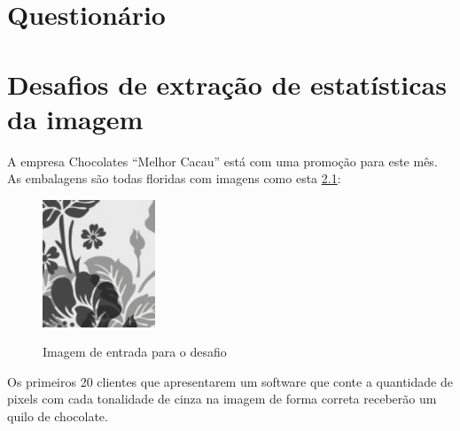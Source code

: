 \documentclass[
	12pt,				%
	oneside,			%
	a4paper,			%
	english,			%
	french,				%
	spanish,			%
	brazil,				%
	]{abntex2}
\begin{document}
\postextual






\begin{apendicesenv}

\partapendices

\chapter{Questionário}
\label{apen:questionario}

\lipsum[55-57]

\chapter{Desafios de extração de estatísticas da imagem}
\label{desafio:estatistica}

A empresa Chocolates “Melhor Cacau” está com uma promoção para este mês. As embalagens são todas floridas com imagens como esta \ref{fig:desafioEstatistica}:

\begin{figure}[ht]
\centering
\caption{Imagem de entrada para o desafio}
\includegraphics[width=0.3\textwidth]{imagens/Desafio_estatisticas.png}
\label{fig:desafioEstatistica}
\sourceAuthor
\end{figure}

Os primeiros 20 clientes que apresentarem um software que conte a quantidade de pixels com cada tonalidade de cinza na imagem de forma correta receberão um quilo de chocolate.


\end{apendicesenv}
\end{document}
